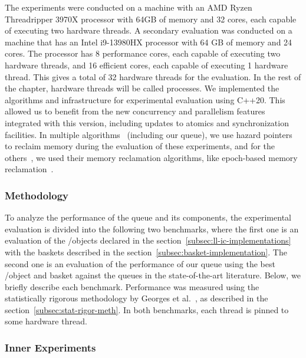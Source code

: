 The experiments were conducted on a machine with an AMD Ryzen Threadripper 3970X processor with 64GB of memory and 32 cores, each capable of executing two hardware threads. A secondary evaluation was conducted on a machine that has an Intel i9-13980HX processor with 64 GB of memory and 24 cores. The processor has 8 performance cores, each capable of executing two hardware threads, and 16 efficient cores, each capable of executing 1 hardware thread. This gives a total of 32 hardware threads for the evaluation. In the rest of the chapter, hardware threads will be called processes. We implemented the algorithms and infrastructure for experimental evaluation using C++20. This allowed us to benefit from the new concurrency and parallelism features integrated with this version, including updates to atomics and synchronization facilities. In multiple algorithms~\cite{ DBLP_conf_podc_MichaelS96,ppopp2013x86queues, Ramalhete_Correia_MPMC_2016} (including our queue), we use hazard pointers~\cite{DBLP_conf_podc_Michael02} to reclaim memory during the evaluation of these experiments, and for the others~\cite{scalingconcurrent2020, DBLP_conf_ppopp_YangM16}, we used their memory reclamation algorithms, like epoch-based memory reclamation~\cite{DBLP_phd_ethos_Fraser04,mckenney2001read}.

\subsubsection{\label{subsubsec:queues-experiment-methodology}Methodology}

To analyze the performance of the queue and its components, the experimental evaluation is divided into the following two benchmarks, where the first one is an evaluation of the \LL/\IC objects declared in the section~\ref{subsec:ll-ic-implementations} with the baskets described in the section~\ref{subsec:basket-implementation}. The second one is an evaluation of the performance of our queue using the best \LL/\IC object and basket against the queues in the state-of-the-art literature. Below, we briefly describe each benchmark. Performance was measured using the statistically rigorous methodology by Georges et al.~\cite{DBLP_conf_oopsla_GeorgesBE07}, as described in the section~\ref{subsec:stat-rigor-meth}. In both benchmarks, each thread is pinned to some hardware thread.

\subsubsection{\label{subsubsec:queue-experiments-inner-experiments}Inner Experiments}

